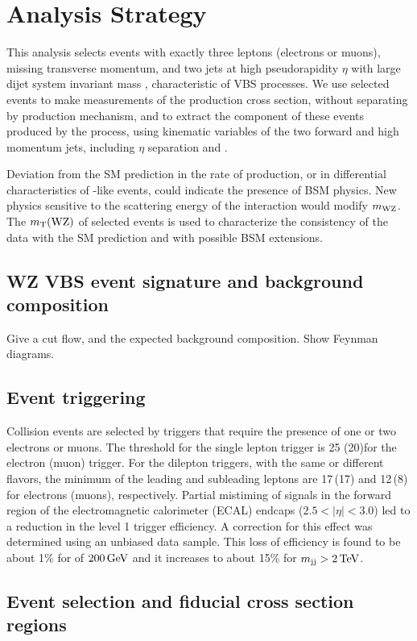 \chapter{Analysis Strategy}

This analysis selects events with exactly three leptons (electrons or muons), 
missing transverse momentum, 
and two jets at high pseudorapidity $\eta$ with large dijet system invariant mass {\mjj},
characteristic of VBS processes.
We use selected
events to make measurements of the \WZjj production cross section, without separating
by production mechanism, and to extract the component of these events produced
by the \EWWZ process, using
kinematic variables of the two forward and high momentum jets, 
including $\eta$ separation and {\mjj}.

Deviation from the SM prediction in the rate of \EWWZ production, or in differential characteristics 
of \EWWZ-like events, could indicate the presence of BSM physics. New physics 
sensitive to the scattering energy of the interaction would modify $m_{\mathrm{W}\mathrm{Z}}$.
The $m_{\mathrm{T}}(\mathrm{W}\mathrm{Z})$ of selected events is used to characterize the consistency of
the data with the SM prediction and with possible BSM extensions.

\section{WZ VBS event signature and background composition}
Give a cut flow, and the expected background composition. Show Feynman diagrams.
\section{Event triggering}

Collision events are selected by triggers that require the presence of
one or two electrons or muons.
The \pt threshold for the single lepton trigger is 25 (20)\GeV for the electron (muon) trigger.
For the dilepton triggers, with the same or different flavors, the minimum \pt of the leading and subleading leptons are 17\,(17) and 12\,(8)\GeV
for electrons (muons), respectively.
Partial mistiming of signals in the forward region of the electromagnetic calorimeter (ECAL) endcaps
($2.5 < \left|\eta\right| < 3.0$) led to a reduction in the level 1 trigger efficiency. 
A correction for this effect was determined using an unbiased data sample. 
This loss of efficiency is found to be about 
1\% for {\mjj} of $200\,\text{Ge\hspace{-.08em}V}$ and it increases to about 15\% for $m_{\mathrm{jj}} > 2\,\text{Te\hspace{-.08em}V}$.

\section{Event selection and fiducial cross section regions}

